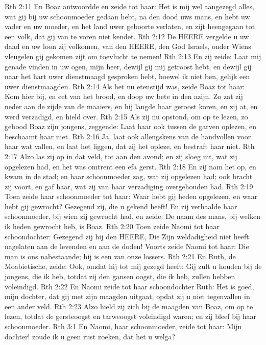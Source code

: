 Rth 2:11  En Boaz antwoordde en zeide tot haar: Het is mij wel aangezegd alles, wat gij bij uw schoonmoeder gedaan hebt, na den dood uws mans, en hebt uw vader en uw moeder, en het land uwer geboorte verlaten, en zijt heengegaan tot een volk, dat gij van te voren niet kendet.
Rth 2:12  De HEERE vergelde u uw daad en uw loon zij volkomen, van den HEERE, den God Israels, onder Wiens vleugelen gij gekomen zijt om toevlucht te nemen!
Rth 2:13  En zij zeide: Laat mij genade vinden in uw ogen, mijn heer, dewijl gij mij getroost hebt, en dewijl gij naar het hart uwer dienstmaagd gesproken hebt, hoewel ik niet ben, gelijk een uwer dienstmaagden.
Rth 2:14  Als het nu etenstijd was, zeide Boaz tot haar: Kom hier bij, en eet van het brood, en doop uw bete in den azijn. Zo zat zij neder aan de zijde van de maaiers, en hij langde haar geroost koren, en zij at, en werd verzadigd, en hield over.
Rth 2:15  Als zij nu opstond, om op te lezen, zo gebood Boaz zijn jongens, zeggende: Laat haar ook tussen de garven oplezen, en beschaamt haar niet.
Rth 2:16  Ja, laat ook allengskens van de handvollen voor haar wat vallen, en laat het liggen, dat zij het opleze, en bestraft haar niet.
Rth 2:17  Alzo las zij op in dat veld, tot aan den avond; en zij sloeg uit, wat zij opgelezen had, en het was omtrent een efa gerst.
Rth 2:18  En zij nam het op, en kwam in de stad; en haar schoonmoeder zag, wat zij opgelezen had; ook bracht zij voort, en gaf haar, wat zij van haar verzadiging overgehouden had.
Rth 2:19  Toen zeide haar schoonmoeder tot haar: Waar hebt gij heden opgelezen, en waar hebt gij gewrocht? Gezegend zij, die u gekend heeft! En zij verhaalde haar schoonmoeder, bij wien zij gewrocht had, en zeide: De naam des mans, bij welken ik heden gewrocht heb, is Boaz.
Rth 2:20  Toen zeide Naomi tot haar schoondochter: Gezegend zij hij den HEERE, Die Zijn weldadigheid niet heeft nagelaten aan de levenden en aan de doden! Voorts zeide Naomi tot haar: Die man is ons nabestaande; hij is een van onze lossers.
Rth 2:21  En Ruth, de Moabietische, zeide: Ook, omdat hij tot mij gezegd heeft: Gij zult u houden bij de jongens, die ik heb, totdat zij den gansen oogst, die ik heb, zullen hebben voleindigd.
Rth 2:22  En Naomi zeide tot haar schoondochter Ruth: Het is goed, mijn dochter, dat gij met zijn maagden uitgaat, opdat zij u niet tegenvallen in een ander veld.
Rth 2:23  Alzo hield zij zich bij de maagden van Boaz, om op te lezen, totdat de gersteoogst en tarweoogst voleindigd waren; en zij bleef bij haar schoonmoeder.
Rth 3:1  En Naomi, haar schoonmoeder, zeide tot haar: Mijn dochter! zoude ik u geen rust zoeken, dat het u welga?
